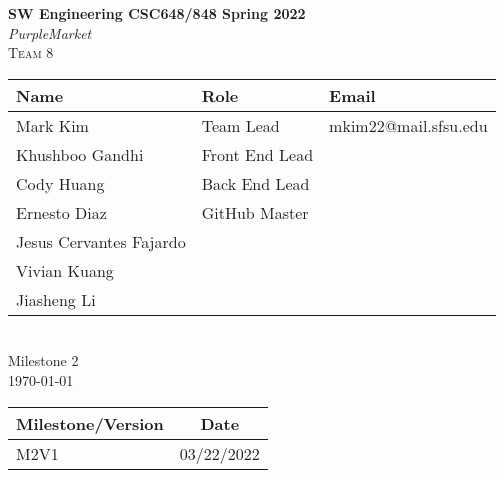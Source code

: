 \begin{titlepage}
\begin{center}
	\vspace*{1cm}
	\LARGE
	\textbf{SW Engineering CSC648/848 Spring 2022}\\
	\textit{PurpleMarket}\\
	\textsc{Team 8}\\
	\vspace{5mm}
	\normalsize
	\begin{tabular}{ | l | l | l | }
	\hline
	Name & Role & Email\\\hline
	Mark Kim & Team Lead & mkim22@mail.sfsu.edu\\
	Khushboo Gandhi & Front End Lead &\\
	Cody Huang & Back End Lead &\\
	Ernesto Diaz & GitHub Master &\\
	Jesus Cervantes Fajardo & &\\
	Vivian Kuang & &\\
	Jiasheng Li & &\\\hline
	\end{tabular}
	\large\\
	\vspace{5mm}
	Milestone 2\\
	\today\\
	\vspace{1cm}
	\begin{tabular}{ | l | c | }
		\hline
		\textbf{Milestone/Version} & \textbf{Date}\\
		\hline
		M2V1 & 03/22/2022\\
		\hline
	\end{tabular}

\end{center}
\end{titlepage}